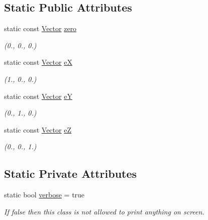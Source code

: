 \subsection*{Static Public Attributes}
\begin{DoxyCompactItemize}
\item 
static const \hyperlink{class_p_c_a_1_1_vector}{Vector} \hyperlink{class_p_c_a_1_1_vector_a72264553beba4bb7c7a3cea65d4bbd4f}{zero}
\begin{DoxyCompactList}\small\item\em (0., 0., 0.) \end{DoxyCompactList}\item 
static const \hyperlink{class_p_c_a_1_1_vector}{Vector} \hyperlink{class_p_c_a_1_1_vector_a2583e534812667f9e5cd69f53569c86b}{eX}
\begin{DoxyCompactList}\small\item\em (1., 0., 0.) \end{DoxyCompactList}\item 
static const \hyperlink{class_p_c_a_1_1_vector}{Vector} \hyperlink{class_p_c_a_1_1_vector_ac937f2d1b63ca297cfa3c6d1eac26e1e}{eY}
\begin{DoxyCompactList}\small\item\em (0., 1., 0.) \end{DoxyCompactList}\item 
static const \hyperlink{class_p_c_a_1_1_vector}{Vector} \hyperlink{class_p_c_a_1_1_vector_a33a36b16ca1a698b6a0e730222406287}{eZ}
\begin{DoxyCompactList}\small\item\em (0., 0., 1.) \end{DoxyCompactList}\end{DoxyCompactItemize}
\subsection*{Static Private Attributes}
\begin{DoxyCompactItemize}
\item 
static bool \hyperlink{class_p_c_a_1_1_vector_a6ef8075198903147f945d0ec81b8defd}{verbose} = true
\begin{DoxyCompactList}\small\item\em If false then this class is not allowed to print anything on screen. \end{DoxyCompactList}\end{DoxyCompactItemize}
